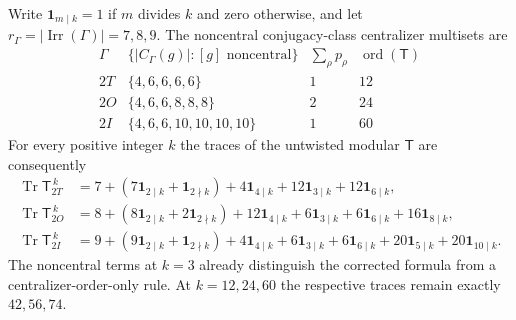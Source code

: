 \documentclass[11pt]{article}
\begin{document}
\begin{theorem}
\label{p1b:thm:v15-T-exponents}
Write $\mathbf1_{m\mid k}=1$ if $m$ divides $k$ and zero otherwise,
and let $r_\Gamma=|\operatorname{Irr}(\Gamma)|=7,8,9$.
The noncentral conjugacy-class centralizer multisets are
\[
\begin{array}{c|c|c|c}
 \Gamma&\{|C_\Gamma(g)|:[g]\text{ noncentral}\}
  &\sum_\rho p_\rho&\operatorname{ord}(\mathsf T)\\\hline
 2T&\{4,6,6,6,6\}&1&12\\
 2O&\{4,6,6,8,8,8\}&2&24\\
 2I&\{4,6,6,10,10,10,10\}&1&60
\end{array}
\tag{T15.8}\label{p1b:eq:v15-centralizers}
\]
For every positive integer $k$ the traces of the untwisted modular
$\mathsf T$ are consequently
\begin{align}
\operatorname{Tr}\mathsf T_{2T}^{\,k}
 &=7+(7\mathbf1_{2\mid k}+\mathbf1_{2\nmid k})
   +4\mathbf1_{4\mid k}+12\mathbf1_{3\mid k}
   +12\mathbf1_{6\mid k},\\
\operatorname{Tr}\mathsf T_{2O}^{\,k}
 &=8+(8\mathbf1_{2\mid k}+2\mathbf1_{2\nmid k})
   +12\mathbf1_{4\mid k}+6\mathbf1_{3\mid k}
   +6\mathbf1_{6\mid k}+16\mathbf1_{8\mid k},\\
\operatorname{Tr}\mathsf T_{2I}^{\,k}
 &=9+(9\mathbf1_{2\mid k}+\mathbf1_{2\nmid k})
   +4\mathbf1_{4\mid k}+6\mathbf1_{3\mid k}
   +6\mathbf1_{6\mid k}+20\mathbf1_{5\mid k}
   +20\mathbf1_{10\mid k}.
\tag{T15.9}\label{p1b:eq:v15-T-traces}
\end{align}
The noncentral terms at $k=3$ already distinguish the corrected formula
from a centralizer-order-only rule.  At $k=12,24,60$ the respective
traces remain exactly $42,56,74$.
\end{theorem}
\end{document}
